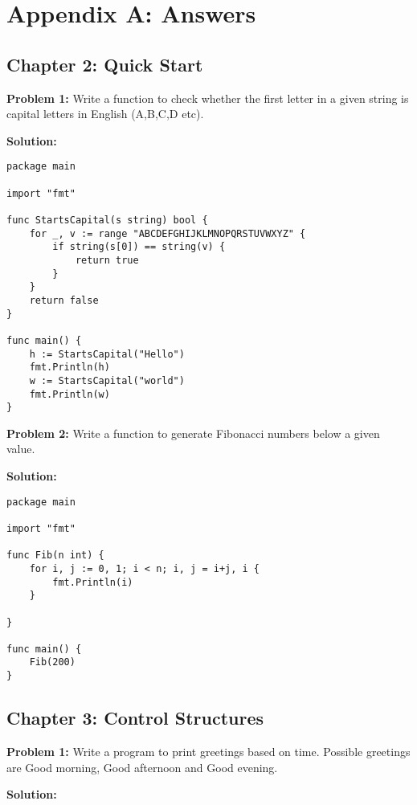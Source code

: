\cleardoublepage
{}
\chapter*{Appendix A: Answers}

\section*{Chapter 2: Quick Start}

\textbf{Problem 1:} Write a function to check whether the first letter
in a given string is capital letters in English (A,B,C,D etc).

\textbf{Solution:}

\begin{lstlisting}[numbers=none]
package main

import "fmt"

func StartsCapital(s string) bool {
    for _, v := range "ABCDEFGHIJKLMNOPQRSTUVWXYZ" {
        if string(s[0]) == string(v) {
            return true
        }
    }
    return false
}

func main() {
    h := StartsCapital("Hello")
    fmt.Println(h)
    w := StartsCapital("world")
    fmt.Println(w)
}
\end{lstlisting}

\textbf{Problem 2:} Write a function to generate Fibonacci numbers
below a given value.

\textbf{Solution:}

\begin{lstlisting}[numbers=none]
package main

import "fmt"

func Fib(n int) {
    for i, j := 0, 1; i < n; i, j = i+j, i {
        fmt.Println(i)
    }

}

func main() {
    Fib(200)
}
\end{lstlisting}

\section*{Chapter 3: Control Structures}

\textbf{Problem 1:} Write a program to print greetings based on time.
Possible greetings are Good morning, Good afternoon and Good evening.

\textbf{Solution:}

